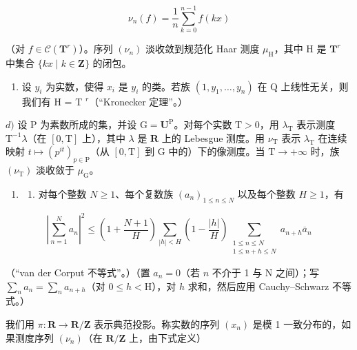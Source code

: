 \[
\nu_ {n} (f) = \frac {1}{n} \sum_ {k = 0} ^ {n - 1} f (k x)
\]

（对 \(f \in \mathcal{C}(\mathbf{T}^r)\)）。序列 \((\nu_n)\) 淡收敛到规范化 Haar 测度 \(\mu_{\mathrm{H}}\)，其中 H 是 \(\mathbf{T}^r\) 中集合 \(\{kx \mid k \in \mathbf{Z}\}\) 的闭包。

\begin{enumerate}
\def\labelenumi{\alph{enumi})}
\setcounter{enumi}{2}
\tightlist
\item
  设 \(y_{i}\) 为实数，使得 \(x_{i}\) 是 \(y_{i}\) 的类。若族 \((1, y_{1}, \ldots, y_{n})\) 在 Q 上线性无关，则我们有 H = T \(^{r}\)（“Kronecker 定理”。）
\end{enumerate}

\(d)\) 设 P 为素数所成的集，并设 \(\mathrm{G} = \mathbf{U}^{\mathrm{P}}\)。对每个实数 \(\mathrm{T} > 0\)，用 \(\lambda_{\mathrm{T}}\) 表示测度 \(\mathrm{T}^{-1}\lambda\)（在 \([0,\mathrm{T}]\) 上），其中 \(\lambda\) 是 \(\mathbf{R}\) 上的 Lebesgue 测度。用 \(\nu_{\mathrm{T}}\) 表示 \(\lambda_{\mathrm{T}}\) 在连续映射 \(t\mapsto (p^{it})_{p\in \mathrm{P}}\)（从 \([0,\mathrm{T}]\) 到 G 中的）下的像测度。当 \(\mathrm{T}\to +\infty\) 时，族 \((\nu_{\mathrm{T}})\) 淡收敛于 \(\mu_{\mathrm{G}}\)。

\begin{enumerate}
\def\labelenumi{\arabic{enumi})}
\setcounter{enumi}{34}
\tightlist
\item
  \begin{enumerate}
  \def\labelenumii{\alph{enumii})}
  \tightlist
  \item
    对每个整数 \(N \geqslant 1\)、每个复数族 \((a_{n})_{1 \leqslant n \leqslant N}\) 以及每个整数 \(H \geqslant 1\)，有
  \end{enumerate}
\end{enumerate}

\[
\left|\sum_{n = 1}^{N}a_{n}\right|^{2}\leqslant \left(1 + \frac{N + 1}{H}\right)\sum_{|h| <   H}\left(1 - \frac{|h|}{H}\right)\sum_{\substack{1\leqslant n\leqslant N\\ 1\leqslant n + h\leqslant N}}a_{n + h}\overline{a}_{n}
\]

（“van der Corput 不等式”。）（置 \(a_{n}=0\)（若 \(n\) 不介于 1 与 N 之间）；写 \(\sum_{n}a_{n}=\sum_{n}a_{n+h}\)（对 \(0\leqslant h<\mathrm{H}\)），对 \(h\) 求和，然后应用 Cauchy–Schwarz 不等式。）

我们用 \(\pi\colon\mathbf{R}\to\mathbf{R}/\mathbf{Z}\) 表示典范投影。称实数的序列 \((x_{n})\) 是模 1 一致分布的，如果测度序列 \((\nu_{n})\)（在 \(\mathbf{R}/\mathbf{Z}\) 上，由下式定义）

